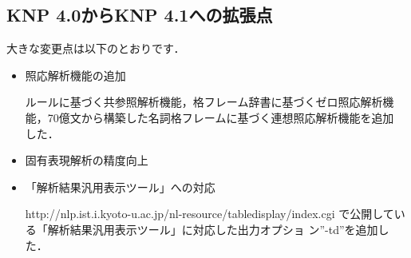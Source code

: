 \documentclass[a4j,11pt,titlepage]{jarticle}
\begin{document}
\subsection{KNP 4.0からKNP 4.1への拡張点}

大きな変更点は以下のとおりです．
\begin{itemize}

 \item 照応解析機能の追加

       ルールに基づく共参照解析機能，格フレーム辞書に基づくゼロ照応解析機
       能，70億文から構築した名詞格フレームに基づく連想照応解析機能を追加
       した．

 \item 固有表現解析の精度向上

 \item 「解析結果汎用表示ツール」への対応

       http://nlp.ist.i.kyoto-u.ac.jp/nl-resource/tabledisplay/index.cgi
       で公開している「解析結果汎用表示ツール」に対応した出力オプショ
       ン''-td''を追加した．

\end{itemize}
\end{document}
